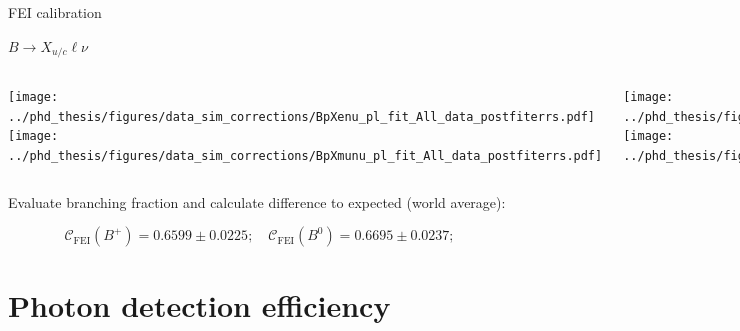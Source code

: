 \documentclass[xcolor=dvipsnames]{beamer}
\begin{document}
\begin{frame}{FEI calibration}

   \centering\scriptsize

   $B\rightarrow X_{u/c} \ell \nu$

   \vspace{0pt}

   \begin{columns}
\centering
      \texttt{[image: ../phd\_thesis/figures/data\_sim\_corrections/BpXenu\_pl\_fit\_All\_data\_postfiterrs.pdf]}
      \texttt{[image: ../phd\_thesis/figures/data\_sim\_corrections/BpXmunu\_pl\_fit\_All\_data\_postfiterrs.pdf]}

      \centering
      \texttt{[image: ../phd\_thesis/figures/data\_sim\_corrections/B0Xenu\_pl\_fit\_All\_data\_postfiterrs.pdf]}
      \texttt{[image: ../phd\_thesis/figures/data\_sim\_corrections/B0Xenu\_pl\_fit\_All\_data\_postfiterrs.pdf]}

   \end{columns}

\vspace{0pt}

   Evaluate branching fraction and calculate difference to expected (world average):

   \begin{equation*}\label{eq:fei_calibration}
      \mathcal{C}_{\mathrm{FEI}}(B^+) = 0.6599 \pm 0.0225; \quad \mathcal{C}_{\mathrm{FEI}}(B^0) = 0.6695 \pm 0.0237;
  \end{equation*}

\end{frame}

\section{Photon detection efficiency}
\end{document}
